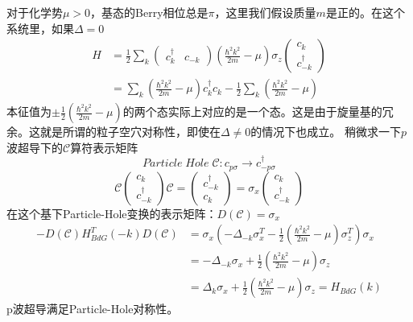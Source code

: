 \documentclass{article}
\numberwithin{equation}{subsection}
\begin{document}
对于化学势$\mu>0$，基态的Berry相位总是$\pi$，这里我们假设质量$m$是正的。在这个系统里，如果$\Delta=0$\
\begin{equation}
    \begin{split}
        H&=\frac{1}{2}\sum_{k}\begin{pmatrix}
            c_k^\dagger&c_{-k}
            \end{pmatrix}(\frac{\hbar^2k^2}{2m}-\mu)\sigma_z\begin{pmatrix}
                c_k\\
                c_{-k}^\dagger
        \end{pmatrix}\\
        &=\sum_{k}(\frac{\hbar^2 k^2}{2m}-\mu)c_k^\dagger c_k-\frac{1}{2}\sum_{k}(\frac{\hbar^2 k^2}{2m}-\mu)
    \end{split}
\end{equation}
本征值为$\pm\frac{1}{2}(\frac{\hbar^2 k^2}{2m}-\mu)$的两个态实际上对应的是一个态。这是由于旋量基的冗余。这就是所谓的粒子空穴对称性，即使在$\Delta\neq0$的情况下也成立。
稍微求一下$p$波超导下的$\mathcal{C}$算符表示矩阵
\begin{equation}
    Particle\;Hole\;\mathcal{C}:c_{p\sigma}\longrightarrow c_{-p\sigma}^\dagger
\end{equation}
\begin{equation}
    \mathcal{C}\begin{pmatrix}
        c_{k}\\
        c_{-k}^\dagger
    \end{pmatrix}\mathcal{C}=\begin{pmatrix}
        c_{-k}^\dagger\\
        c_k
    \end{pmatrix}=\sigma_x\begin{pmatrix}
        c_{k}\\
        c_{-k}^\dagger
    \end{pmatrix}
\end{equation}
在这个基下Particle-Hole变换的表示矩阵：$D(\mathcal{C})=\sigma_x$
\begin{equation}
    \begin{split}
        -D(\mathcal{C})H_{BdG}^T(-k)D(\mathcal{C})&=\sigma_x(-\Delta_{-k}\sigma_x^T-\frac{1}{2}(\frac{\hbar^2 k^2}{2m}-\mu)\sigma_z^T)\sigma_x\\
        &=-\Delta_{-k}\sigma_x+\frac{1}{2}(\frac{\hbar^2 k^2}{2m}-\mu)\sigma_z\\
        &=\Delta_k\sigma_x+\frac{1}{2}(\frac{\hbar^2 k^2}{2m}-\mu)\sigma_z=H_{BdG}(k)
    \end{split}
\end{equation}
p波超导满足Particle-Hole对称性。
\end{document}
